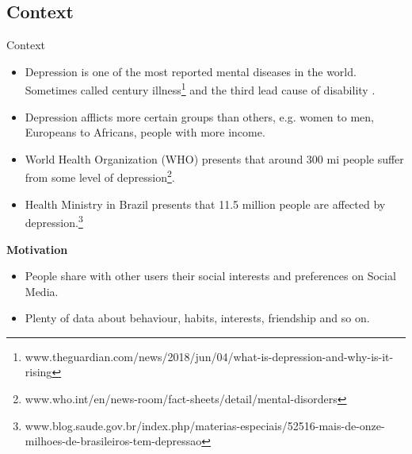 \documentclass[aspectratio=169,10pt,xcolor={dvipsnames}]{beamer}
\begin{document}
\subsection{Context}
\begin{frame}{Context}

\small{
  \begin{block}{}
    \begin{itemize}
      \item Depression is one of the most reported mental diseases in the world. Sometimes called century illness\footnote{www.theguardian.com/news/2018/jun/04/what-is-depression-and-why-is-it-rising} and the third lead cause of disability \cite{IHME}.
      \item Depression afflicts more certain groups than others, e.g. women to men, Europeans to Africans, people with more income.
      \item World Health Organization (WHO) presents that around 300 mi people suffer from some level of depression\footnote{www.who.int/en/news-room/fact-sheets/detail/mental-disorders}.
      \item Health Ministry in Brazil presents that 11.5 million people are affected by depression.\footnote{www.blog.saude.gov.br/index.php/materias-especiais/52516-mais-de-onze-milhoes-de-brasileiros-tem-depressao}
    \end{itemize}    
  \end{block}
}

\small{
  \begin{block}{\small{\textbf{Motivation}}}
    \begin{itemize}
      \item People share with other users their social interests and preferences on Social Media.
      \item Plenty of data about behaviour, habits, interests, friendship and so on.
    \end{itemize}
  \end{block}    
}
\end{frame}
\end{document}
